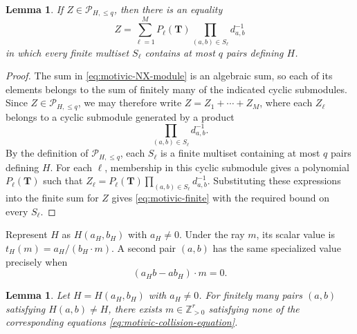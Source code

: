 \documentclass[12pt]{amsart}
\numberwithin{equation}{section}
\theoremstyle{plain}
\newtheorem{lemma}[theorem]{Lemma}
\theoremstyle{definition}
\theoremstyle{remark}
\theoremstyle{definition}
\newcommand{\Z}{\mathbb Z}
\begin{document}
\begin{lemma}\label{lem:motivic-finite-witness}
If $Z\in\mathscr P_{H,\le q}$, then there is an equality
\begin{equation} \label{eq:motivic-finite}
Z=\sum_{\ell=1}^MP_\ell(\mathbf T)\prod_{(a,b)\in S_\ell}d_{a,b}^{-1}
\end{equation}
in which every finite multiset $S_\ell$ contains at most $q$ pairs defining $H$.
\end{lemma}

\begin{proof}
The sum in \eqref{eq:motivic-NX-module} is an algebraic sum, so each of its elements belongs to the sum of finitely many of the indicated cyclic submodules. Since $Z\in\mathscr P_{H,\le q}$, we may therefore write $Z=Z_1+\cdots+Z_M$, where each $Z_\ell$ belongs to a cyclic submodule generated by a product
\[
\prod_{(a,b)\in S_\ell}d_{a,b}^{-1}.
\]
By the definition of $\mathscr P_{H,\le q}$, each $S_\ell$ is a finite multiset containing at most $q$ pairs defining $H$. For each $\ell$, membership in this cyclic submodule gives a polynomial $P_\ell(\mathbf T)$ such that $Z_\ell=P_\ell(\mathbf T)\prod_{(a,b)\in S_\ell}d_{a,b}^{-1}$. Substituting these expressions into the finite sum for $Z$ gives \eqref{eq:motivic-finite} with the required bound on every $S_\ell$.
\end{proof}



Represent $H$ as $H(a_H,b_H)$ with $a_H\ne0$. Under the ray $m$, its scalar value is $t_H(m)=a_H/(b_H\cdot m)$. A second pair $(a,b)$ has the same specialized value precisely when
\begin{equation}\label{eq:motivic-collision-equation}
 (a_Hb-ab_H)\cdot m=0.
\end{equation}

\begin{lemma}\label{lem:motivic-positive-ray}
Let $H=H(a_H,b_H)$ with $a_H\ne0$. For finitely many pairs $(a,b)$ satisfying $H(a,b)\ne H$, there exists $m\in\Z_{>0}^r$ satisfying none of the corresponding equations \eqref{eq:motivic-collision-equation}.
\end{lemma}
\end{document}

